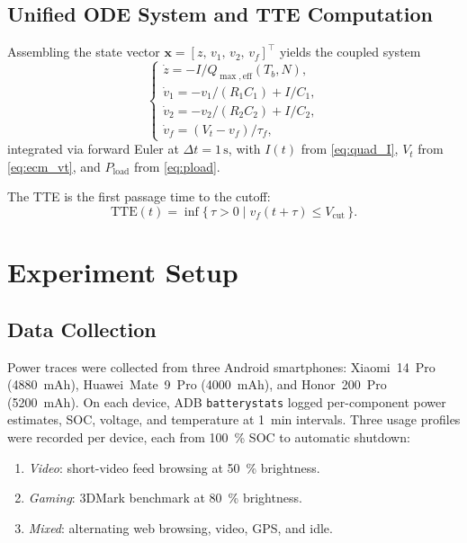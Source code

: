 \documentclass[conference]{IEEEtran}
\begin{document}
\subsection{Unified ODE System and TTE Computation}

Assembling the state vector $\mathbf{x} = [z,\, v_1,\, v_2,\, v_f]^{\top}$ yields the coupled system
\begin{equation}
    \begin{cases}
        \dot{z} = -I / Q_{\max,\mathrm{eff}}(T_b, N), \\[4pt]
        \dot{v}_1 = -v_1/(R_1 C_1) + I/C_1, \\[4pt]
        \dot{v}_2 = -v_2/(R_2 C_2) + I/C_2, \\[4pt]
        \dot{v}_f = (V_t - v_f)/\tau_f,
    \end{cases}
    \label{eq:odesys}
\end{equation}
integrated via forward Euler at $\Delta t = 1\,\mathrm{s}$, with $I(t)$ from \eqref{eq:quad_I}, $V_t$ from \eqref{eq:ecm_vt}, and $P_{\mathrm{load}}$ from \eqref{eq:pload}.

The TTE is the first passage time to the cutoff:
\begin{equation}
    \mathrm{TTE}(t) = \inf\{\, \tau > 0 \mid v_f(t + \tau) \leq V_{\mathrm{cut}} \,\}.
    \label{eq:tte_def}
\end{equation}







\section{Experiment Setup}
\label{sec:experiment}

\subsection{Data Collection}

Power traces were collected from three Android smartphones: Xiaomi~14~Pro (4880~mAh), Huawei~Mate~9~Pro (4000~mAh), and Honor~200~Pro (5200~mAh). On each device, ADB \texttt{batterystats} logged per-component power estimates, SOC, voltage, and temperature at \SI{1}{min} intervals. Three usage profiles were recorded per device, each from \SI{100}{\percent} SOC to automatic shutdown:

\begin{enumerate}
    \item[1)] \textit{Video}: short-video feed browsing at \SI{50}{\percent} brightness.
    \item[2)] \textit{Gaming}: 3DMark benchmark at \SI{80}{\percent} brightness.
    \item[3)] \textit{Mixed}: alternating web browsing, video, GPS, and idle.
\end{enumerate}
\end{document}
